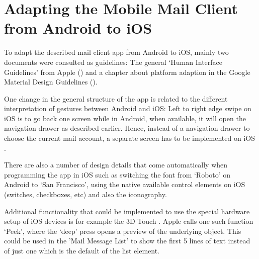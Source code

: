 \documentclass[a4paper,11pt,twoside]{article}
\begin{document}
\section{Adapting the Mobile Mail Client from Android to iOS}
To adapt the described mail client app from Android to iOS, mainly two documents
were consulted as guidelines: The general `Human Interface Guidelines' from
Apple (\cite{apple_ios_design}) and a chapter about platform adaption in the
Google Material Design Guidelines (\cite{adapt_ios}).

One change in the general structure of the app is related to the different
interpretation of gestures between Android and iOS: Left to right edge swipe
on iOS is to go back one screen while in Android, when available, it will open
the navigation drawer as described earlier. Hence, instead of a navigation drawer
to choose the current mail account, a separate screen has to be implemented
on iOS \cite{adapt_ios}.

There are also a number of design details that come automatically when programming
the app in iOS such as switching the font from `Roboto' on Android to
`San Francisco', using the native available control elements on iOS (switches,
checkboxes, etc) and also the iconography.

Additional functionality that could be implemented to use the special hardware
setup of iOS devices is for example the 3D Touch \cite{apple_ios_3dtouch}. Apple
calls one such function `Peek', where the `deep' press opens a preview of the
underlying object. This could be used in the 'Mail Message List' to show the
first 5 lines of text instead of just one which is the default of the list element.



\end{document}
